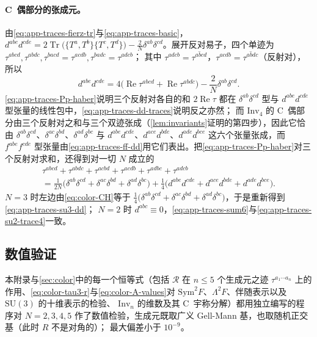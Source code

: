 \documentclass[UTF8,a4paper,11pt,fontset=fandol]{ctexart}
\theoremstyle{cplain}
\theoremstyle{cdefinition}
\theoremstyle{cremark}
\numberwithin{equation}{section}
\DeclareMathOperator{\Tr}{Tr}
\DeclareMathOperator{\Real}{Re}
\newcommand{\Rop}{\mathcal{R}}                       %
\begin{document}
\paragraph{C~偶部分的张成元。}由\cref{eq:app-traces-fierz-tr}与\cref{eq:app-traces-basic}，
$d^{abe}d^{cde}=2\Tr\bigl(\{T^a,T^b\}\{T^c,T^d\}\bigr)-\frac2N\delta^{ab}\delta^{cd}$。展开反对易子，四个单迹为 $\tau^{abcd},\tau^{abdc},\tau^{bacd}=\tau^{acdb},\tau^{badc}=\tau^{adcb}$；
其中 $\tau^{adcb}=\overline{\tau^{abcd}}$，$\tau^{acdb}=\overline{\tau^{abdc}}$（反射对），所以
\begin{equation}\label{eq:app-traces-dd-traces}
d^{abe}d^{cde}=4\bigl(\Real\tau^{abcd}+\Real\tau^{abdc}\bigr)-\frac2N\delta^{ab}\delta^{cd}.
\end{equation}
\cref{eq:app-traces-Pp-haber}说明三个反射对各自的和 $2\Real\tau$ 都在 $\delta^{ab}\delta^{cd}$ 型与 $d^{abe}d^{cde}$ 型张量的线性包中，\cref{eq:app-traces-dd-traces}说明反之亦然；
而 $\mathrm{Inv}_4$ 的 C~偶部分由三个反射对之和与三个双迹张成（\cref{lem:invariants}证明的第四步），因此它恰由 $\delta^{ab}\delta^{cd}$、$\delta^{ac}\delta^{bd}$、$\delta^{ad}\delta^{bc}$ 与 $d^{abe}d^{cde}$、$d^{ace}d^{bde}$、$d^{ade}d^{bce}$ 这六个张量张成，而 $f^{abe}f^{cde}$ 型张量由\cref{eq:app-traces-ff-dd}用它们表出。把\cref{eq:app-traces-Pp-haber}对三个反射对求和，还得到对一切 $N$ 成立的
\begin{multline}\label{eq:app-traces-sum6}
\tau^{abcd}+\tau^{abdc}+\tau^{acbd}+\tau^{acdb}+\tau^{adbc}+\tau^{adcb}\\
=\frac{1}{2N}\bigl(\delta^{ab}\delta^{cd}+\delta^{ac}\delta^{bd}+\delta^{ad}\delta^{bc}\bigr)+\frac14\bigl(d^{abe}d^{cde}+d^{ace}d^{bde}+d^{ade}d^{bce}\bigr).
\end{multline}
$N=3$ 时左边由\cref{eq:color-CH}等于 $\frac14\bigl(\delta^{ab}\delta^{cd}+\delta^{ac}\delta^{bd}+\delta^{ad}\delta^{bc}\bigr)$，于是重新得到\cref{eq:app-traces-su3-dd}；
$N=2$ 时 $d^{abc}\equiv0$，\cref{eq:app-traces-sum6}与\cref{eq:app-traces-su2-trace4}一致。

\subsection{数值验证}\label{sec:app-traces-numerics}

本附录与\cref{sec:color}中的每一个恒等式（包括 $\Rop$ 在 $n\le5$ 个生成元之迹 $\tau^{a_1\cdots a_n}$ 上的作用、\cref{eq:color-tau3-r}与\cref{eq:color-A-values}对 $\mathrm{Sym}^2F$、$\Lambda^2F$、伴随表示以及 $\mathrm{SU}(3)$ 的十维表示的检验、
$\mathrm{Inv}_n$ 的维数及其 C~宇称分解）都用独立编写的程序对 $N=2,3,4,5$ 作了数值检验，生成元既取广义 Gell-Mann 基，也取随机正交基（此时 $R$ 不是对角的）；
最大偏差小于 $10^{-9}$。
\end{document}
